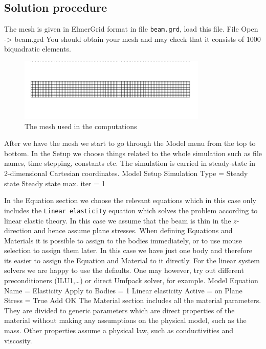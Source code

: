 \subsection*{Solution procedure}

The mesh is given in ElmerGrid format in file \texttt{beam.grd}, load this file.
\ttbegin
File 
  Open -> beam.grd
\ttend
You should obtain your mesh and may check that it consists of 1000 biquadratic elements.
\begin{figure}[h!]
\begin{center}
  \includegraphics[width=0.8\textwidth,viewport=0 30 900 270,clip]{beammesh}
  \caption{The mesh used in the computations}
  \label{fig:elast_mesh}
\end{center}
\end{figure}

After we have the mesh we start to go through the Model menu from the top to bottom. 
In the Setup we choose things related to the whole simulation such as file names, 
time stepping, constants etc.
The simulation is carried in steady-state in 2-dimensional Cartesian
coordinates. 
\ttbegin
Model
  Setup 
    Simulation Type = Steady state
    Steady state max. iter = 1
\ttend

In the Equation section we choose the relevant equations which in this case only includes 
the \texttt{Linear elasticity} equation
which solves the problem according to 
linear elastic theory.
In this case we assume that the beam is thin in the $z$-direction and hence assume plane stresses.
When defining Equations and Materials it is possible to assign to the bodies immediately, or to use mouse
selection to assign them later. In this case we have just one body and therefore its easier to assign 
the Equation and Material to it directly.
For the linear system solvers we are happy to use the defaults. One may however, try out different
preconditioners (ILU1,\ldots) or direct Umfpack solver, for example.
\ttbegin
Model
  Equation
    Name = Elasticity
    Apply to Bodies = 1
    Linear elasticity
      Active = on
      Plane Stress = True
    Add 
    OK
\ttend        
The Material section includes all the material parameters.
They are divided to generic parameters which are direct properties of the material
without making any assumptions on the physical model, such as the mass. Other properties assume
a physical law, such as conductivities and viscosity. 

